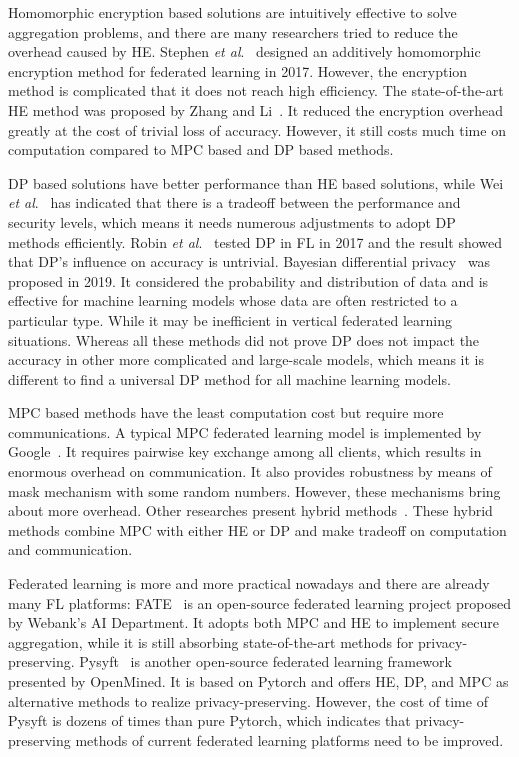 Homomorphic encryption based solutions are intuitively effective to solve aggregation problems, and there are many researchers tried to reduce the overhead caused by HE. Stephen \emph{et al}.~\cite{abs-1711-10677} designed an additively homomorphic encryption method for federated learning in 2017. However, the encryption method is complicated that it does not reach high efficiency. The state-of-the-art HE method was proposed by Zhang and Li~\cite{BatchCrypt}. It reduced the encryption overhead greatly at the cost of trivial loss of accuracy. However, it still costs much time on computation compared to MPC based and DP based methods.

DP based solutions have better performance than HE based solutions, while Wei \emph{et al}.~\cite{DPAnalysis} has indicated that there is a tradeoff between the performance and security levels, which means it needs numerous adjustments to adopt DP methods efficiently. Robin \emph{et al}.~\cite{geyer2017differentially} tested DP in FL in 2017 and the result showed that DP's influence on accuracy is untrivial. Bayesian differential privacy~\cite{Bayesian} was proposed in 2019. It considered the probability and distribution of data and is effective for machine learning models whose data are often restricted to a particular type. While it may be inefficient in vertical federated learning situations. Whereas all these methods did not prove DP does not impact the accuracy in other more complicated and large-scale models, which means it is different to find a universal DP method for all machine learning models.

MPC based methods have the least computation cost but require more communications. A typical MPC federated learning model is implemented by Google~\cite{Practical}. It requires pairwise key exchange among all clients, which results in enormous overhead on communication. It also provides robustness by means of mask mechanism with some random numbers. However, these mechanisms bring about more overhead. Other researches present hybrid methods~\cite{Hybrid,HybridAlpha}. These hybrid methods combine MPC with either HE or DP and make tradeoff on computation and communication.

Federated learning is more and more practical nowadays and there are already many FL platforms: FATE~\cite{fate} is an open-source federated learning project proposed by Webank’s AI Department. It adopts both MPC and HE to implement secure aggregation, while it is still absorbing state-of-the-art methods for privacy-preserving. Pysyft~\cite{pysyft} is another open-source federated learning framework presented by OpenMined. It is based on Pytorch and offers HE, DP, and MPC as alternative methods to realize privacy-preserving. However, the cost of time of Pysyft is dozens of times than pure Pytorch, which indicates that privacy-preserving methods of current federated learning platforms need to be improved.
